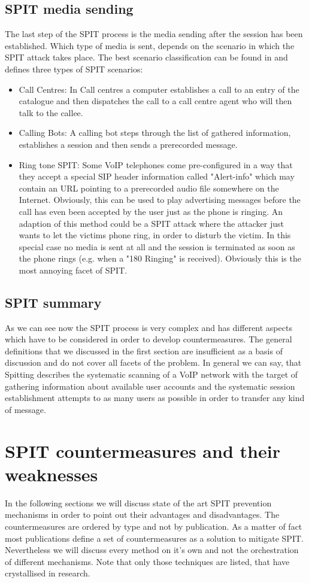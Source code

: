 \documentclass[final
	]{issa}
\begin{document}
\subsection{SPIT media sending}
The last step of the SPIT process is the media sending after the session has been established. Which type of media is sent, depends on the scenario in which the SPIT attack takes place. The best scenario classification can be found in \cite{paper:SPITreach} and defines three types of SPIT scenarios:
\begin{itemize}
\item Call Centres: In Call centres a computer establishes a call to an entry of the catalogue and then dispatches the call to a call centre agent who will then talk to the callee.
\item Calling Bots: A calling bot steps through the list of gathered information, establishes a session and then sends a prerecorded message.
\item Ring tone SPIT: Some VoIP telephones come pre-configured in a way that they accept a special SIP header information called "Alert-info" which may contain an URL pointing to a prerecorded audio file somewhere on the Internet. Obviously, this can be used to play advertising messages before the call has even been accepted by the user just as the phone is ringing. An adaption of this method could be a SPIT attack where the attacker just wants to let the victims phone ring, in order to disturb the victim. In this special case no media is sent at all and the session is terminated as soon as the phone rings (e.g. when a "180 Ringing" is received). Obviously this is the most annoying facet of SPIT.
\end{itemize}
\subsection{SPIT summary}
As we can see now the SPIT process is very complex and has different aspects which have to be considered in order to develop countermeasures. The general definitions that we discussed in the first section are insufficient as a basis of discussion and do not cover all facets of the problem. In general we can say, that Spitting describes the systematic scanning of a VoIP network with the target of gathering information about available user accounts and the systematic session establishment attempts to as many users as possible in order to transfer any kind of message.

\section{SPIT countermeasures and their weaknesses}
In the following sections we will discuss state of the art SPIT prevention mechanisms in order to point out their advantages and disadvantages. The countermeasures are ordered by type and not by publication. As a matter of fact most publications define a set of countermeasures as a solution to mitigate SPIT. Nevertheless we will discuss every method on it's own and not the orchestration of different mechanisms. Note that only those techniques are listed, that have crystallised in research.
\end{document}

